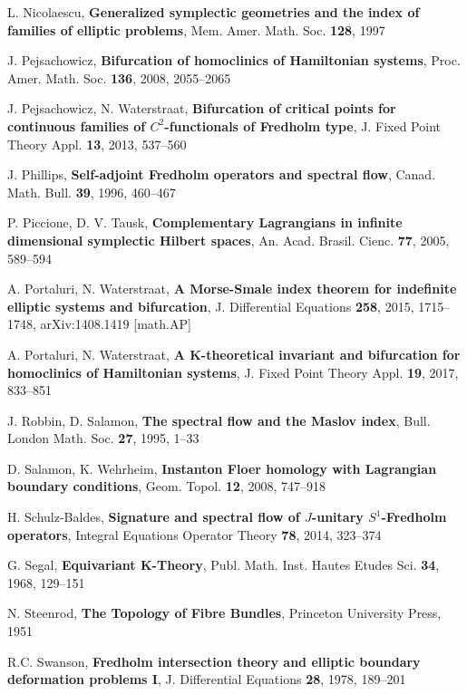 \documentclass[a4paper,10pt]{article}
\begin{document}
 L. Nicolaescu, \textbf{Generalized symplectic geometries and the index of families of elliptic problems}, Mem. Amer. Math. Soc. \textbf{128}, 1997

 J. Pejsachowicz, \textbf{Bifurcation of homoclinics of Hamiltonian systems}, Proc. Amer. Math. Soc. \textbf{136}, 2008, 2055--2065

 J. Pejsachowicz, N. Waterstraat, \textbf{Bifurcation of critical points for continuous families of $C^2$-functionals of Fredholm type}, J. Fixed Point Theory Appl. \textbf{13}, 2013, 537--560

 J. Phillips, \textbf{Self-adjoint Fredholm operators and spectral flow}, Canad. Math. Bull. \textbf{39}, 1996, 460--467 

 P. Piccione, D. V.  Tausk, \textbf{Complementary Lagrangians in infinite dimensional symplectic Hilbert spaces}, An. Acad. Brasil. Cienc.  \textbf{77}, 2005, 589--594

 A. Portaluri, N. Waterstraat, \textbf{A Morse-Smale index theorem for indefinite elliptic systems and bifurcation}, J. Differential Equations \textbf{258}, 2015, 1715--1748, arXiv:1408.1419 [math.AP]

 A. Portaluri, N. Waterstraat, \textbf{A K-theoretical invariant and bifurcation for homoclinics of Hamiltonian systems}, J. Fixed Point Theory Appl.  \textbf{19}, 2017, 833--851

 J. Robbin, D. Salamon, \textbf{The spectral flow and the Maslov index}, Bull. London Math. Soc.  \textbf{27}, 1995, 1--33
		
 D. Salamon, K. Wehrheim, \textbf{Instanton Floer homology with Lagrangian boundary conditions}, Geom. Topol. \textbf{12}, 2008, 747--918

 H. Schulz-Baldes, \textbf{Signature and spectral flow of $J$-unitary $S^1$-Fredholm operators}, Integral Equations Operator Theory \textbf{78}, 2014, 323--374

 G. Segal, \textbf{Equivariant K-Theory}, Publ. Math. Inst. Hautes Etudes Sci. \textbf{34}, 1968, 129--151

 N. Steenrod, \textbf{The Topology of Fibre Bundles}, Princeton University Press, 1951

 R.C. Swanson, \textbf{Fredholm intersection theory and elliptic boundary deformation
 problems I}, J. Differential Equations \textbf{28}, 1978, 189--201
\end{document}
